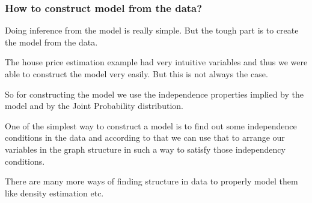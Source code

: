 \documentclass{article}
\begin{document}
    \subsubsection{How to construct model from the
data?}\label{how-to-construct-model-from-the-data}

Doing inference from the model is really simple. But the tough part is
to create the model from the data.

    The house price estimation example had very intuitive variables and thus
we were able to construct the model very easily. But this is not always
the case.

So for constructing the model we use the independence properties implied
by the model and by the Joint Probability distribution.

    One of the simplest way to construct a model is to find out some
independence conditions in the data and according to that we can use
that to arrange our variables in the graph structure in such a way to
satisfy those independency conditions.

    There are many more ways of finding structure in data to properly model
them like density estimation etc.


    
    
    
    
\end{document}

